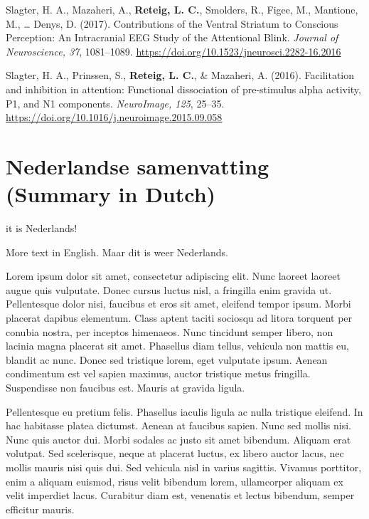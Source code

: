 \documentclass[11pt,english,]{memoir}
\newcommand{\textdutch}[2][]{\foreignlanguage{dutch}{#2}}
\newenvironment{dutch}[2][]{\begin{otherlanguage}{dutch}}{\end{otherlanguage}}
\begin{document}
Slagter, H. A., Mazaheri, A., \textbf{Reteig, L. C.}, Smolders, R., Figee, M., Mantione, M., \ldots{} Denys, D. (2017). Contributions of the Ventral Striatum to Conscious Perception: An Intracranial EEG Study of the Attentional Blink. \emph{Journal of Neuroscience, 37}, 1081--1089. \url{https://doi.org/10.1523/jneurosci.2282-16.2016}\newline

Slagter, H. A., Prinssen, S., \textbf{Reteig, L. C.}, \& Mazaheri, A. (2016). Facilitation and inhibition in attention: Functional dissociation of pre-stimulus alpha activity, P1, and N1 components. \emph{NeuroImage, 125}, 25--35. \url{https://doi.org/10.1016/j.neuroimage.2015.09.058}

\normalsize
\setlength{\parindent}{1.5em}

\hypertarget{nederlandse-samenvatting-summary-in-dutch}{%
\chapter*{Nederlandse samenvatting (Summary in Dutch)}\label{nederlandse-samenvatting-summary-in-dutch}}


\begin{dutch}

Dit is Nederlands!

\end{dutch}

More text in English. \textdutch{Maar dit is weer Nederlands.}

Lorem ipsum dolor sit amet, consectetur adipiscing elit. Nunc laoreet laoreet augue quis vulputate. Donec cursus luctus nisl, a fringilla enim gravida ut. Pellentesque dolor nisi, faucibus et eros sit amet, eleifend tempor ipsum. Morbi placerat dapibus elementum. Class aptent taciti sociosqu ad litora torquent per conubia nostra, per inceptos himenaeos. Nunc tincidunt semper libero, non lacinia magna placerat sit amet. Phasellus diam tellus, vehicula non mattis eu, blandit ac nunc. Donec sed tristique lorem, eget vulputate ipsum. Aenean condimentum est vel sapien maximus, auctor tristique metus fringilla. Suspendisse non faucibus est. Mauris at gravida ligula.

Pellentesque eu pretium felis. Phasellus iaculis ligula ac nulla tristique eleifend. In hac habitasse platea dictumst. Aenean at faucibus sapien. Nunc sed mollis nisi. Nunc quis auctor dui. Morbi sodales ac justo sit amet bibendum. Aliquam erat volutpat. Sed scelerisque, neque at placerat luctus, ex libero auctor lacus, nec mollis mauris nisi quis dui. Sed vehicula nisl in varius sagittis. Vivamus porttitor, enim a aliquam euismod, risus velit bibendum lorem, ullamcorper aliquam ex velit imperdiet lacus. Curabitur diam est, venenatis et lectus bibendum, semper efficitur mauris.
\end{document}
